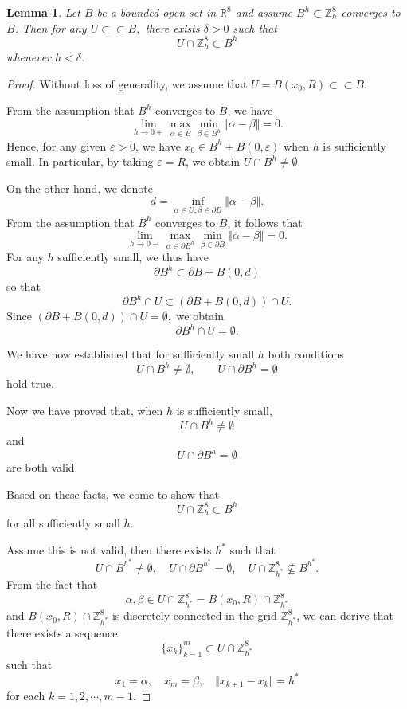 \documentclass{amsart}
\newtheorem{lemma}[theorem]{Lemma}
\theoremstyle{definition}
\theoremstyle{remark}
\numberwithin{equation}{section}
\newcommand{\R}{\mathbb{R}}
\newcommand{\p}{\partial}
\newcommand{\Z}{\mathbb Z}
\begin{document}
\begin{lemma}\label{2023-09-11 21:51:03}
    Let $B$ be a bounded open set in $\R^8$ and assume $B^h\subset \Z^8_h$ converges to $B$. Then for any $U \subset\subset B,$ there exists $\delta>0$ such that
    \[
U \cap \Z^8_h \subset B^h
\] whenever $h<\delta.$
\end{lemma}

\begin{proof}
    Without loss of generality, we assume that $U = B(x_0, R) \subset\subset B.$

    From the assumption that $B^h$ converges to $B$, we have \[
\lim_{h\to 0+} \max_{\alpha\in \overline{B}}\min_{\beta\in B^h}\Vert \alpha-\beta\Vert =0.
\] Hence, for any given $\varepsilon>0$, we have $x_0\in B^h+B(0,\varepsilon)$ when $h$ is sufficiently small. In particular, by taking $\varepsilon=R$, we obtain $U\cap B^h\neq \emptyset$.

    On the other hand, we denote \[
d=\inf_{\alpha\in U,\beta \in \p B}\Vert \alpha-\beta \Vert.
\]
    From the assumption that $B^h$ converges to $B$, it follows that \[
\lim_{h\to 0+}\max_{\alpha\in \p B^h}\min_{\beta\in \p B}\Vert \alpha-\beta \Vert=0.
\]
    For any $h$ sufficiently small, we thus have \[
\p B^h \subset \p B+B(0,d)
\] so that \[
\p B^h\cap U\subset (\p B+B(0,d))\cap U.
\] Since $(\p B+B(0,d))\cap U=\emptyset,$ we obtain \[
\p B^h\cap U=\emptyset.
\]




   We have now established that for sufficiently small $h$
    both conditions
     \[
U \cap B^h \neq \emptyset, \qquad  U \cap \p B^h = \emptyset
\]
  hold true.





    Now we have proved that, when $h$ is sufficiently small, \[
U \cap B^h \neq \emptyset
\] and \[
U \cap \p B^h = \emptyset
\] are both valid.



    Based on these facts, we come to show that \[
U\cap \Z^8_h \subset B^h
\]
    for all sufficiently  small $h$.



    Assume this is not valid, then there exists $h^*$ such that \begin{equation*}
        U \cap B^{h^*} \neq \emptyset, \quad U \cap \p B^{h^*} = \emptyset, \quad U\cap \Z_{h^*}^8\nsubseteq B^{h^*}.
    \end{equation*}
    From the fact that \[
\alpha,\beta\in U\cap \Z^8_{h^*}=B(x_0,R)\cap \Z^8_{h^*}
\] and $B(x_0,R)\cap \Z^8_{h^*}$ is discretely connected in the grid $\Z^8_{h^*}$, we can derive that there exists a sequence \[
\{x_k\}_{k=1}^m \subset U \cap \Z^8_{h^*}
\] such that
    \begin{equation*}
        x_1=\alpha,\quad x_m=\beta,\quad \Vert x_{k+1}-x_k\Vert =h^*
    \end{equation*}
    for each $k=1,2,\cdots,m-1.$



\end{proof}
\end{document}
